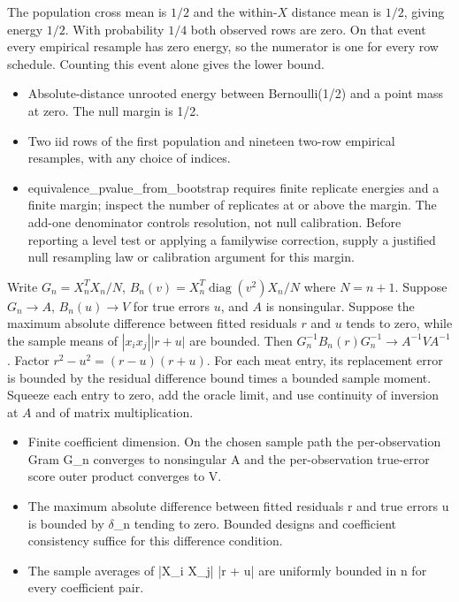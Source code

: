 \expandafter\def\csname statadic@proof@STATADIC-EQUIVALENCE-001\endcsname{The population cross mean is $1/2$ and the within-$X$
  distance mean is $1/2$, giving energy $1/2$. With probability $1/4$
  both observed rows are zero. On that event every empirical resample has
  zero energy, so the numerator is one for every row schedule. Counting this
  event alone gives the lower bound.}
\expandafter\def\csname statadic@assumptions@STATADIC-EQUIVALENCE-001\endcsname{\begin{itemize}
\item Absolute-distance unrooted energy between Bernoulli(1/2) and a point mass at zero. The null margin is 1/2.
\item Two iid rows of the first population and nineteen two-row empirical resamples, with any choice of indices.
\end{itemize}}
\expandafter\def\csname statadic@diagnostics@STATADIC-EQUIVALENCE-001\endcsname{\begin{itemize}
\item equivalence\_pvalue\_from\_bootstrap requires finite replicate energies and a finite margin; inspect the number of replicates at or above the margin. The add-one denominator controls resolution, not null calibration. Before reporting a level test or applying a familywise correction, supply a justified null resampling law or calibration argument for this margin.
\end{itemize}}
\expandafter\def\csname statadic@statement@STATADIC-LINEAR-012\endcsname{Write $G_n=X_n^T X_n/N$, $B_n(v)=X_n^T\operatorname{diag}(v^2)X_n/N$
  where $N=n+1$. Suppose $G_n\to A$, $B_n(u)\to V$ for true errors $u$,
  and $A$ is nonsingular. Suppose the maximum absolute difference between
  fitted residuals $r$ and $u$ tends to zero, while the sample means of
  $|x_i x_j||r+u|$ are bounded. Then $G_n^{-1}B_n(r)G_n^{-1}\to A^{-1}VA^{-1}$.}
\expandafter\def\csname statadic@proof@STATADIC-LINEAR-012\endcsname{Factor $r^2-u^2=(r-u)(r+u)$. For each meat entry, its
  replacement error is bounded by the residual difference bound times a
  bounded sample moment. Squeeze each entry to zero, add the oracle limit,
  and use continuity of inversion at $A$ and of matrix multiplication.}
\expandafter\def\csname statadic@assumptions@STATADIC-LINEAR-012\endcsname{\begin{itemize}
\item Finite coefficient dimension. On the chosen sample path the per-observation Gram G\_n converges to nonsingular A and the per-observation true-error score outer product converges to V.
\item The maximum absolute difference between fitted residuals r and true errors u is bounded by \ensuremath{\delta}\_n tending to zero. Bounded designs and coefficient consistency suffice for this difference condition.
\item The sample averages of |X\_i X\_j| |r + u| are uniformly bounded in n for every coefficient pair.
\end{itemize}}
